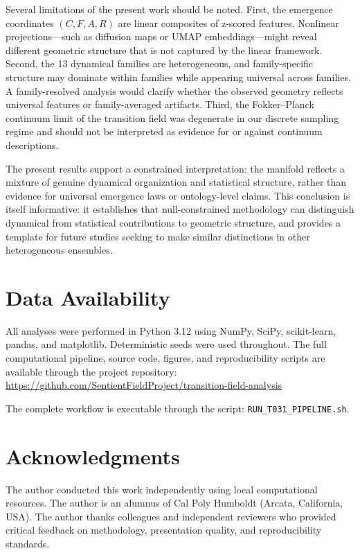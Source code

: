 \documentclass[%
 aip,
 chaos,
 amsmath,amssymb,
 reprint,
]{revtex4-2}
\begin{document}
Several limitations of the present work should be noted. First, the emergence coordinates $(C,F,A,R)$ are linear composites of z-scored features. Nonlinear projections---such as diffusion maps or UMAP embeddings---might reveal different geometric structure that is not captured by the linear framework. Second, the 13 dynamical families are heterogeneous, and family-specific structure may dominate within families while appearing universal across families. A family-resolved analysis would clarify whether the observed geometry reflects universal features or family-averaged artifacts. Third, the Fokker--Planck continuum limit of the transition field was degenerate in our discrete sampling regime and should not be interpreted as evidence for or against continuum descriptions.

The present results support a constrained interpretation: the manifold reflects a mixture of genuine dynamical organization and statistical structure, rather than evidence for universal emergence laws or ontology-level claims. This conclusion is itself informative: it establishes that null-constrained methodology can distinguish dynamical from statistical contributions to geometric structure, and provides a template for future studies seeking to make similar distinctions in other heterogeneous ensembles.

\section{Data Availability}

All analyses were performed in Python 3.12 using NumPy, SciPy, scikit-learn, pandas, and matplotlib. Deterministic seeds were used throughout. The full computational pipeline, source code, figures, and reproducibility scripts are available through the project repository:
\url{https://github.com/SentientFieldProject/transition-field-analysis}

The complete workflow is executable through the script:
\texttt{RUN\_T031\_PIPELINE.sh}.

\section{Acknowledgments}

The author conducted this work independently using local computational resources. The author is an alumnus of Cal Poly Humboldt (Arcata, California, USA). The author thanks colleagues and independent reviewers who provided critical feedback on methodology, presentation quality, and reproducibility standards.



\end{document}
